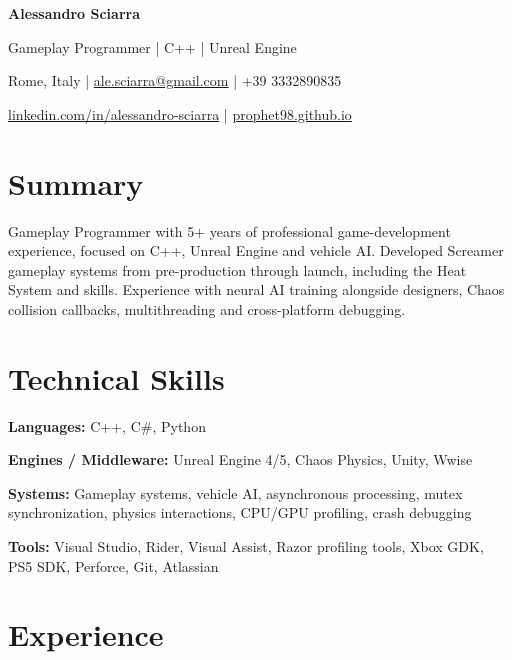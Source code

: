 \documentclass[10pt,a4paper]{article}
\begin{document}
{\fontsize{23}{26}\selectfont\textbf{Alessandro Sciarra}}\par
\vspace{3pt}

{\large Gameplay Programmer | C++ | Unreal Engine}\par
\vspace{4pt}

{\small
    Rome, Italy
    \enspace|\enspace
    \href{mailto:ale.sciarra@gmail.com}{ale.sciarra@gmail.com}
    \enspace|\enspace
    +39 3332890835\par
    \href{https://www.linkedin.com/in/alessandro-sciarra/}
         {linkedin.com/in/alessandro-sciarra}
    \enspace|\enspace
    \href{https://prophet98.github.io/}{prophet98.github.io}
}\par

\section{Summary}

Gameplay Programmer with 5+ years of professional game-development
experience, focused on C++, Unreal Engine and vehicle AI.
Developed Screamer gameplay systems from pre-production through launch,
including the Heat System and skills. Experience with neural AI training
alongside designers, Chaos collision callbacks, multithreading and
cross-platform debugging.

\section{Technical Skills}

\textbf{Languages:} C++, C\#, Python\par

\textbf{Engines / Middleware:}
Unreal Engine 4/5, Chaos Physics, Unity, Wwise\par

\textbf{Systems:}
Gameplay systems, vehicle AI, asynchronous processing,
mutex synchronization, physics interactions, CPU/GPU profiling,
crash debugging\par

\textbf{Tools:}
Visual Studio, Rider, Visual Assist, Razor profiling tools,
Xbox GDK, PS5 SDK, Perforce, Git, Atlassian\par

\section{Experience}
\end{document}
